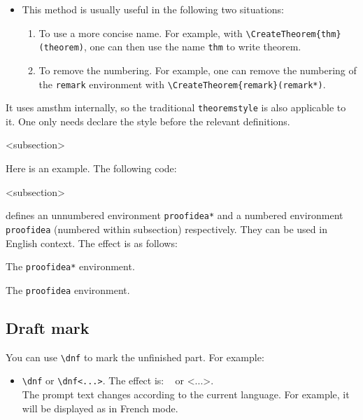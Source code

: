 \documentclass{minimart}
\newenvironment{remind}[1][Remind]{%
    \LocallyStopLineNumbers%
    \begin{tcolorbox}[breakable,
        enhanced,
        width = \textwidth,
        colback = white, colbacktitle = paper,
        colframe = gray!50, boxrule=0.2mm,
        coltitle = black,
        fonttitle = \sffamily,
        attach boxed title to top left = {yshift=-\tcboxedtitleheight/2,  xshift=\tcboxedtitlewidth/4},
        boxed title style = {boxrule=0pt, colframe=paper},
        before skip = 0.3cm,
        after skip = 0.3cm,
        top = 3mm,
        bottom = 3mm,
        title={\sffamily #1}]%
}{\end{tcolorbox}\ResumeLineNumbers}
\begin{document}
\begin{itemize}
\begin{itemize}
            \item This method is usually useful in the following two situations:
                \begin{enumerate}
                    \item To use a more concise name. For example, with \lstinline|\CreateTheorem{thm}|\\\lstinline|(theorem)|, one can then use the name \texttt{thm} to write theorem.
                    \item To remove the numbering. For example, one can remove the numbering of the \texttt{remark} environment with \lstinline|\CreateTheorem{remark}(remark*)|.
                \end{enumerate}
        \end{itemize}
\end{itemize}

\begin{remind}
    It uses \textsf{amsthm} internally, so the traditional \texttt{theoremstyle} is also applicable to it. One only needs declare the style before the relevant definitions.
\end{remind}

\def\proofideanameEN{Idea}
<subsection>

\bigskip
Here is an example. The following code:
\begin{code}
  \def\proofideanameEN{Idea}
  <subsection>
\end{code}
defines an unnumbered environment \lstinline|proofidea*| and a numbered environment \lstinline|proofidea| (numbered within subsection) respectively. They can be used in English context. The effect is as follows:

\begin{proofidea*}
    The \lstinline|proofidea*| environment.
\end{proofidea*}

\begin{proofidea}
    The \lstinline|proofidea| environment.
\end{proofidea}

\subsection{Draft mark}

You can use \lstinline|\dnf| to mark the unfinished part. For example:
\begin{itemize}
    \item \lstinline|\dnf| or \lstinline|\dnf<...>|. The effect is: \dnf~ or \dnf<...>. \\The prompt text changes according to the current language. For example, it will be displayed as  in French mode.
\end{itemize}
\end{document}
